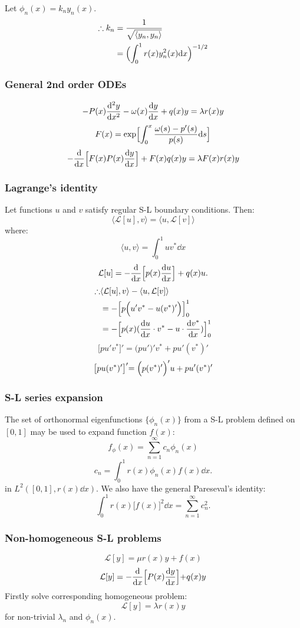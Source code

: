 \documentclass{article}
\begin{document}
\begin{multicols}{3}
Let $\phi_n(x)=k_n y_n(x)$.
\begin{align*}
    \therefore k_n
    &=\frac{1}{\sqrt{\langle y_n,y_n \rangle}} \\
    &=\Bigl(\int_{0}^{1}r(x)y_n^2(x)\dd x\Bigr)^{-1/2}
\end{align*}

\subsubsection*{General 2nd order ODEs}
$$-P(x)\dv[2]{y}{x}-\omega(x)\dv{y}{x}+q(x)y=\lambda r(x)y$$
$$F(x)=\exp\Bigl[\int_{0}^{x}
\frac{\omega(s)-p'(s)}{p(s)}\dd s\Bigr]$$
$$-\dv{x}\Bigl[F(x)P(x)\dv{y}{x}\Bigr]
+F(x)q(x)y=\lambda F(x)r(x)y$$

\subsubsection*{Lagrange's identity}
Let functions $u$ and $v$ satisfy regular S-L boundary conditions.
Then:
$$\langle \mathcal{L}[u], v \rangle=\langle u, \mathcal{L}[v] \rangle$$
where:
$$\langle u,v \rangle=\int_{0}^{1}uv^* \dd x$$
$$\mathcal{L}[u]=-\dv{x}\Bigl[p(x)\dv{u}{x}\Bigr]+q(x)u.$$
\begin{align*}
    \therefore&\langle \mathcal{L}[u], v \rangle - \langle u, \mathcal{L}[v] \rangle \\
    &=-\Bigl[p\Bigl(u'v^*-u(v^*)'\Bigl)\Bigl]_{0}^{1} \\
    &=-\Bigl[p(x)(\dv{u}{x}\cdot v^*-u\cdot\dv{v^*}{x})\Bigl]_{0}^{1}
\end{align*}
$$\bigl[pu'v^*\bigl]'=\bigl(pu'\bigl)'v^*+pu'(v^*)'$$
$$\bigl[pu(v^*)'\bigl]'=\Bigl(p(v^*)'\Bigl)'u+pu'(v^*)'$$

\subsubsection*{S-L series expansion}
The set of orthonormal eigenfunctions $\{\phi_n(x)\}$
from a S-L problem defined on $[0,1]$
may be used to expand function $f(x)$:
$$f_\phi(x)=\sum_{n=1}^{\infty} c_n\phi_n(x)$$
$$c_n=\int_{0}^{1}r(x)\phi_n(x)f(x)\dd x.$$
in $L^2([0,1], r(x)\dd x)$.
We also have the general Pareseval's identity:
$$\int_{0}^{1}r(x)\bigl[f(x)\bigr]^2\dd x
=\sum_{n=1}^{\infty}c_n^2.$$

\subsubsection*{Non-homogeneous S-L problems}
$$\mathcal{L}[y]=\mu r(x)y+f(x)$$
$$\mathcal{L}[y]=-\dv{x}\Bigl[P(x)\dv{y}{x}\Bigl]+q(x)y$$
Firstly solve corresponding homogeneous problem:
$$\mathcal{L}[y]=\lambda r(x)y$$
for non-trivial $\lambda_n$ and $\phi_n(x)$.


\end{multicols}
\end{document}
